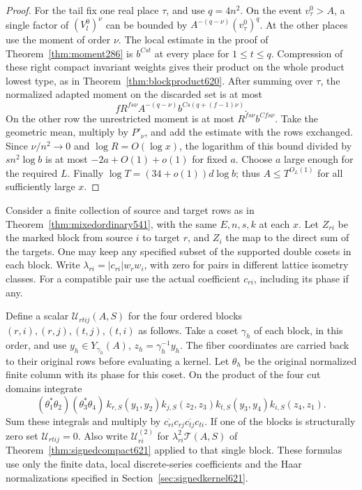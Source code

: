 \documentclass[a4paper,11pt]{article}
\theoremstyle{definition}
\theoremstyle{remark}
\numberwithin{equation}{section}
\begin{document}
\begin{proof}
For the tail fix one real place \(\tau\), and use \(q=4n^2\).
On the event \(v_\tau^0>A\), a single factor of
\((V_l^0)^\nu\) can be bounded by
\(A^{-(q-\nu)}(v_\tau^0)^q\). At the other places use the
moment of order \(\nu\). The local estimate in the proof of
Theorem~\ref{thm:moment286} is \(b^{Cst}\) at every place
for \(1\le t\le q\). Compression of these right compact
invariant weights gives their product on the whole product
lowest type, as in Theorem~\ref{thm:blockproduct620}.
After summing over \(\tau\), the normalized adapted moment
on the discarded set is at most
\[
       f R^{fs\nu} A^{-(q-\nu)} b^{Cs(q+(f-1)\nu)}.
\]
On the other row the unrestricted moment is at most
\(R^{fs\nu}b^{Cfs\nu}\).
Take the geometric mean, multiply by \(P'_\nu\), and add
the estimate with the rows exchanged. Since
\(\nu/n^2\to0\) and \(\log R=O(\log x)\), the logarithm of
this bound divided by \(s n^2\log b\) is at most
\(-2a+O(1)+o(1)\) for fixed \(a\). Choose \(a\) large enough
for the required \(L\). Finally \(\log T=(34+o(1))d\log b\);
thus \(A\le T^{O_L(1)}\) for all sufficiently large \(x\).
\end{proof}

Consider a finite collection of source and target rows as in
Theorem~\ref{thm:mixedordinary541}, with the same \(E,n,s,k\)
at each \(x\). Let \(Z_{ri}\) be the marked block from source
\(i\) to target \(r\), and \(Z_i\) the map to the direct sum
of the targets. One may keep any specified subset of the
supported double cosets in each block. Write
\(\lambda_{ri}=|c_{ri}|w_rw_i\), with zero for pairs in
different lattice isometry classes. For a compatible pair use
the actual coefficient \(c_{ri}\), including its phase if any.

Define a scalar \(\mathcal U_{rtij}(A,S)\) for the four ordered
blocks \((r,i),(r,j),(t,j),(t,i)\) as follows. Take a coset
\(\gamma_h\) of each block, in this order, and use
\(y_h\in Y_{\gamma_h}(A)\), \(z_h=\gamma_h^{-1}y_h\).
The fiber coordinates are carried back to their original rows
before evaluating a kernel. Let \(\theta_h\) be the original
normalized finite column with its phase for this coset. On the
product of the four cut domains integrate
\[
 (\theta_1^*\theta_2)(\theta_3^*\theta_4)\,
 k_{r,S}(y_1,y_2)k_{j,S}(z_2,z_3)
 k_{t,S}(y_3,y_4)k_{i,S}(z_4,z_1).
\]
Sum these integrals and multiply by
\(\overline{c_{ri}}c_{rj}\overline{c_{tj}}c_{ti}\).
If one of the blocks is structurally zero set
\(\mathcal U_{rtij}=0\). Also write \(\mathcal U_{ri}^{(2)}\)
for \(\lambda_{ri}^2\mathcal T(A,S)\) of
Theorem~\ref{thm:signedcompact621} applied to that single
block. These formulas use only the finite data, local
discrete-series coefficients and the Haar normalizations
specified in Section~\ref{sec:signedkernel621}.
\end{document}
